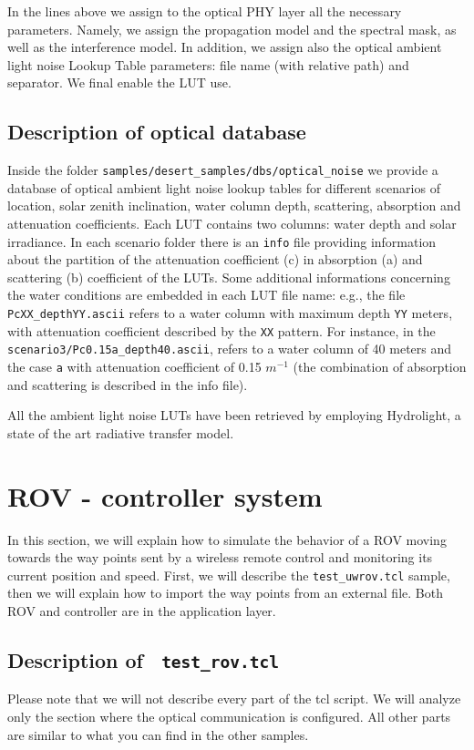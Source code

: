 \documentclass[11pt]{article}
\begin{document}
In the lines above we assign to the optical PHY layer all the necessary parameters. Namely, we assign the propagation model and the spectral mask, as well as the interference model. In addition, we assign also the optical ambient light noise Lookup Table parameters: file name (with relative path) and separator. We final enable the LUT use.

\subsection{Description of  optical database}
Inside the folder {\tt samples/desert\_samples/dbs/optical\_noise} we provide a database of optical ambient light noise lookup tables for different scenarios of location, solar zenith inclination, water column depth, scattering, absorption and attenuation coefficients. 
Each LUT contains two columns: water depth and solar irradiance.
In each scenario folder there is an {\tt info} file providing information about the partition of the attenuation coefficient (c) in absorption (a) and scattering (b) coefficient of the LUTs. Some additional informations concerning the water conditions are embedded in each LUT file name: e.g., the file {\tt PcXX\_depthYY.ascii} refers to a water column with maximum depth {\tt YY} meters, with attenuation coefficient described by the {\tt XX} pattern. For instance, in the {\tt scenario3/Pc0.15a\_depth40.ascii}, refers to a water column of 40 meters and the case {\tt a} with attenuation coefficient of 0.15 $m^{-1}$ (the combination of absorption and scattering is described in the info file).

All the ambient light noise LUTs have been retrieved by employing Hydrolight, a state of the art radiative transfer model.


\clearpage
\section{ROV - controller system}
\label{sec:uwrov}
In this section, we will explain how to simulate the behavior of a ROV moving towards the way points sent by a wireless remote control and monitoring its current position and speed. First, we will describe the {\tt test\_uwrov.tcl} sample, then we will explain how to import the way points from an external file. Both ROV and controller are in the application layer.
\subsection{Description of  \ {\tt test\_rov.tcl}}
Please note that we will not describe every part of the tcl script. We will analyze only the section where the optical communication is configured. All other parts are similar to what you can find in the other samples.
\end{document}
